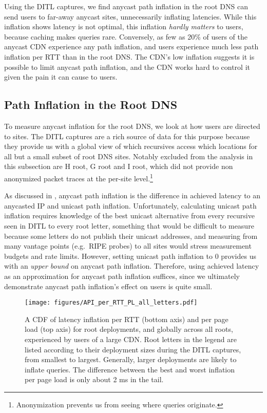 \documentclass[sigconf,letterpaper,nonacm,10pt,anonymous]{acmart}
\begin{document}
Using the DITL captures, we find anycast path inflation in the root DNS
can send users to far-away anycast sites, unnecessarily inflating
latencies. While this inflation shows latency is not optimal, this
inflation \emph{hardly matters} to users, because caching makes queries
rare. Conversely, as few as 20\% of users of the anycast CDN experience
any path inflation, and users experience much less path inflation per
RTT than in the root DNS. The CDN's low inflation suggests it is
possible to limit anycast path inflation, and the CDN works hard to
control it given the pain it can cause to users.

\subsection{Path Inflation in the Root
DNS}\label{path-inflation-in-the-root-dns}

\label{sec:root_dns_anycast}

To measure anycast inflation for the root DNS, we look at how users are
directed to sites. The DITL captures are a rich source of data for this
purpose because they provide us with a global view of which recursives
access which locations for all but a small subset of root DNS sites.
Notably excluded from the analysis in this subsection are H root, G root
and I root, which did not provide non anonymized packet traces at the
per-site level.\footnote{Anonymization prevents us from seeing where
  queries originate.}

As discussed in , anycast path
inflation is the difference in achieved latency to an anycasted IP and
unicast path inflation. Unfortunately, calculating unicast path
inflation requires knowledge of the best unicast alternative from every
recursive seen in DITL to every root letter, something that would be
difficult to measure because some letters do not publish their unicast
addresses, and measuring from many vantage points (e.g.~RIPE probes) to
all sites would stress measurement budgets and rate limits. However,
setting unicast path inflation to 0 provides us with an
\emph{upper bound} on anycast path inflation. Therefore, using achieved
latency as an approximation for anycast path inflation suffices, since
we ultimately demonstrate anycast path inflation's effect on users is
quite small.

\begin{figure}
    \centering
    \texttt{[image: figures/API\_per\_RTT\_PL\_all\_letters.pdf]}
    \caption{A CDF of latency inflation per RTT (bottom axis) and per page load (top axis) for root deployments, and globally across all roots, experienced by users of a large CDN. Root letters in the legend are listed according to their deployment sizes during the DITL captures, from smallest to largest. Generally, larger deployments are likely to inflate queries. The difference between the best and worst inflation per page load is only about 2 ms in the tail. }
    \label{fig:api_per_rtt_roots}
\end{figure}
\end{document}
